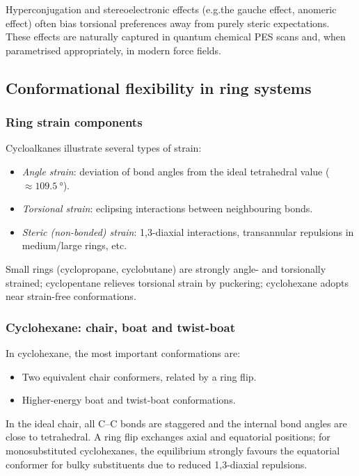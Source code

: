 \documentclass[12pt]{article}
\begin{document}
Hyperconjugation and stereoelectronic effects (e.g.the gauche effect,
anomeric effect) often bias torsional preferences away from purely steric
expectations. These effects are naturally captured in quantum chemical PES
scans and, when parametrised appropriately, in modern force fields.

\subsection{Conformational flexibility in ring systems}

\subsubsection{Ring strain components}

Cycloalkanes illustrate several types of strain:
\begin{itemize}
  \item \textit{Angle strain}: deviation of bond angles from the ideal tetrahedral value (\(\approx\SI{109.5}{\degree}\)).
  \item \textit{Torsional strain}: eclipsing interactions between neighbouring bonds.
  \item \textit{Steric (non-bonded) strain}: 1,3-diaxial interactions, transannular repulsions in medium/large rings, etc.
\end{itemize}
Small rings (cyclopropane, cyclobutane) are strongly angle- and torsionally strained; cyclopentane relieves torsional strain by puckering; cyclohexane adopts near strain-free conformations.

\subsubsection{Cyclohexane: chair, boat and twist-boat}

In cyclohexane, the most important conformations are:
\begin{itemize}
  \item Two equivalent chair conformers, related by a ring flip.
  \item Higher-energy boat and twist-boat conformations.
\end{itemize}

In the ideal chair, all C--C bonds are staggered and the internal bond angles are close to tetrahedral. A ring flip exchanges axial and equatorial positions; for monosubstituted cyclohexanes, the equilibrium strongly favours the equatorial conformer for bulky substituents due to reduced 1,3-diaxial repulsions.
\end{document}
